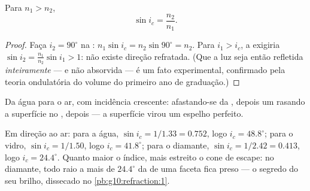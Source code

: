 \begin{proposition}\label{prop:g10:refraction:criticalformula}
Para $n_1 > n_2$,
\[
\sin i_c = \frac{n_2}{n_1} .
\]
\end{proposition}

\begin{proof}
Faça $i_2 = 90^\circ$ na : $n_1 \sin i_c = n_2 \sin 90^\circ
= n_2$. Para $i_1 > i_c$, a  exigiria
$\sin i_2 = \frac{n_1}{n_2}\sin i_1 > 1$: não existe direção refratada.
(Que a luz seja então refletida \emph{inteiramente} --- e não absorvida
--- é um fato experimental, confirmado pela teoria ondulatória do volume
do primeiro ano de graduação.)
\end{proof}

\begin{omfigure}

{\small Da água para o ar, com incidência crescente:  afastando-se
da , depois um  rasando a superfície no , depois  --- a superfície virou um espelho
perfeito.}
\end{omfigure}

\begin{example}\label{ex:g10:refraction:criticalvalues}
Em direção ao ar: para a água, $\sin i_c = 1/1.33 = 0.752$, logo
$i_c = 48.8^\circ$; para o vidro, $\sin i_c = 1/1.50$, logo
$i_c = 41.8^\circ$; para o diamante, $\sin i_c = 1/2.42 = 0.413$, logo
$i_c = 24.4^\circ$. Quanto maior o índice, mais estreito o cone de
escape: no diamante, todo raio a mais de $24.4^\circ$ da  de uma
faceta fica preso --- o segredo do seu brilho, dissecado no
\cref{pb:g10:refraction:1}.
\end{example}

